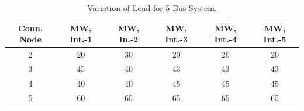 \documentclass[preprint,12pt,3p]{elsarticle}
\begin{document}
	\begin{table}[ht] 
		
		\caption{Variation of Load for 5 Bus System.} %
		
		\centering %
		
		\begin{tabular}{| c | c | c | c | c | c |} %
			
			\hline\hline %
			
			Conn. Node & MW, Int.-1 & MW, In.-2 & MW, Int.-3  & MW, Int.-4 & MW, Int.-5 \\ [0.5ex] %
			
			
			\hline %
			
			2 &	20 &	30 &	20 &	20 &	20 \\ %
			\hline
			3 &	45 &	40 &	43 &	43 &	43 \\ %
			\hline
			4 &	40 &	40 &	45 &	45 &	45 \\ %
			\hline
			5 &	60 &	65 &	65 &	65 &	65 \\ %
			\hline
		\end{tabular} 
		
		\label{table:5LASCOPFLoadModified} %
		
	\end{table}
\end{document}
